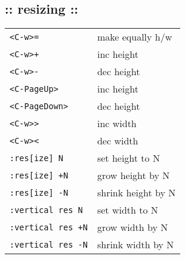 \subsection{:: resizing ::}
\begin{tabular}{@{}ll@{}}
    \verb!<C-w>=!               & make equally h/w \\
    \verb!<C-w>+!               & inc height \\
    \verb!<C-w>-!               & dec height \\
    \verb!<C-PageUp>!           & inc height \\
    \verb!<C-PageDown>!         & dec height \\
    \verb!<C-w>>!               & inc width \\
    \verb!<C-w><!               & dec width \\
    \verb!:res[ize] N!          & set height to N \\
    \verb!:res[ize] +N!         & grow height by N \\
    \verb!:res[ize] -N!         & shrink height by N \\
    \verb!:vertical res N!      & set width to N \\
    \verb!:vertical res +N!     & grow width by N \\
    \verb!:vertical res -N!     & shrink width by N \\
\end{tabular}

